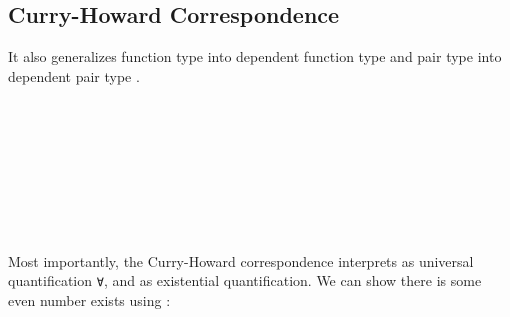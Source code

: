 \subsection*{Curry-Howard Correspondence}

It also generalizes function type  into dependent function type  and pair type  into dependent pair type .

\begin{code}%
\>[0]\AgdaSpace{}%
\AgdaSymbol{:}\AgdaSpace{}%
\AgdaSymbol{(}\AgdaSpace{}%
\AgdaSymbol{:}\AgdaSpace{}%
\AgdaSymbol{)}\AgdaSpace{}%
\AgdaSymbol{(}\AgdaSpace{}%
\AgdaSymbol{:}\AgdaSpace{}%
\AgdaSpace{}%
\AgdaSpace{}%
\AgdaSymbol{)}\AgdaSpace{}%
\AgdaSpace{}%
\<%
\\
\>[0]\AgdaSpace{}%
\AgdaSpace{}%
\AgdaSpace{}%
\AgdaSymbol{=}\AgdaSpace{}%
\AgdaSymbol{(}\AgdaSpace{}%
\AgdaSymbol{:}\AgdaSpace{}%
\AgdaSymbol{)}\AgdaSpace{}%
\AgdaSpace{}%
\AgdaSpace{}%
\<%
\\
%
\\[\AgdaEmptyExtraSkip]%
\>[0]\AgdaSpace{}%
\AgdaSpace{}%
\AgdaSymbol{(}\AgdaSpace{}%
\AgdaSymbol{:}\AgdaSpace{}%
\AgdaSymbol{)}\AgdaSpace{}%
\AgdaSymbol{(}\AgdaSpace{}%
\AgdaSymbol{:}\AgdaSpace{}%
\AgdaSpace{}%
\AgdaSpace{}%
\AgdaSymbol{)}\AgdaSpace{}%
\AgdaSymbol{:}\AgdaSpace{}%
\AgdaSpace{}%
\<%
\\
\>[0][@{}l@{\AgdaIndent{0}}]%
\>[2]\AgdaSpace{}%
\AgdaOperator{\AgdaInductiveConstructor{\AgdaUnderscore{},\AgdaUnderscore{}}}\<%
\\
%
\>[2]\<%
\\
\>[2][@{}l@{\AgdaIndent{0}}]%
\>[4]\AgdaSpace{}%
\AgdaSymbol{:}\AgdaSpace{}%
\<%
\\
%
\>[4]\AgdaSpace{}%
\AgdaSymbol{:}\AgdaSpace{}%
\AgdaSpace{}%
\<%
\end{code}

Most importantly, the Curry-Howard correspondence interprets  as universal quantification \texttt{∀}, and  as existential quantification. We can show there is some even number exists using :

